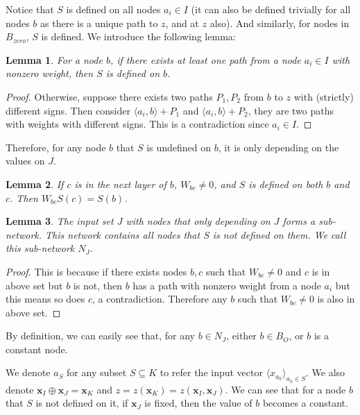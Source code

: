 \documentclass[]{article}
\newtheorem{lemma}{Lemma}
\theoremstyle{definition}
\begin{document}
Notice that $S$ is defined on all nodes $a_i \in I$ (it can also be defined trivially for all nodes $b$ as there is a unique path to $z$, and at $z$ also). And similarly, for nodes in  $B_{zero}$, $S$ is defined. We introduce the following lemma:

\begin{lemma}\label{lem:sign}
	For a node $b$, if there exists at least one path from a node $a_i\in I$ with nonzero weight, then  $S$ is defined on $b$.
\end{lemma}

\begin{proof}
	Otherwise, suppose there exists two paths $P_1,P_2$ from $b$ to $z$ with (strictly) different signs. Then consider $\langle a_i,b\rangle+P_1$ and $\langle a_i,b\rangle+P_2$, they are two paths with weights with different signs. This is a contradiction since $a_i\in I$.
\end{proof}
Therefore, for any node $b$  that $S$ is undefined on $b$, it is only depending on the values on $J$.  

\begin{lemma}
	If $c$ is in the next layer of $b$, $W_{bc}\neq 0$, and $S$ is defined on both $b$ and $c$. Then $W_{bc}S(c)=S(b)$.
\end{lemma}

\begin{lemma}\label{lem:subnetwork2}
	The input set $J$ with nodes that only depending on $J$ forms a sub-network. This network contains all nodes that $S$ is not defined on them. We call this sub-network $N_J$.
\end{lemma}

\begin{proof}
	This is because if there exists nodes $b,c$ such that $W_{bc}\neq 0$ and $c$ is in above set but $b$ is not, then $b$ has a path with nonzero weight from a node $a_i$ but this means so does $c$, a contradiction. Therefore any $b$ such that $W_{bc}\neq 0$ is also in above set.
\end{proof}

By definition, we can easily see that, for any $b\in N_J$, either $b\in B_O$, or $b$ is a constant node.

We denote $a_S$ for any subset $S\subseteq K$ to refer the input vector $\langle x_{a_k}\rangle_{a_k\in S}$. We also denote $\boldsymbol{x}_I\oplus \boldsymbol{x}_J = \boldsymbol{x}_K$ and $z=z(\boldsymbol{x}_K)=z(\boldsymbol{x}_I,\boldsymbol{x}_J)$. We can see that for a node $b$ that $S$ is not defined on it, if $\boldsymbol{x}_J$ is fixed, then the value of $b$ becomes a constant.
\end{document}
